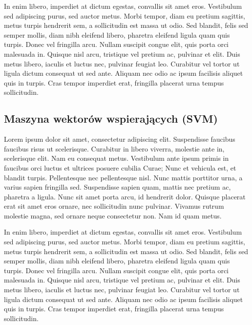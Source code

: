 	In enim libero, imperdiet at dictum egestas, convallis sit amet eros. Vestibulum sed adipiscing purus, sed auctor metus. Morbi tempor, diam eu pretium sagittis, metus turpis hendrerit sem, a sollicitudin est massa ut odio. Sed blandit, felis sed semper mollis, diam nibh eleifend libero, pharetra eleifend ligula quam quis turpis. Donec vel fringilla arcu. Nullam suscipit congue elit, quis porta orci malesuada in. Quisque nisl arcu, tristique vel pretium ac, pulvinar et elit. Duis metus libero, iaculis et luctus nec, pulvinar feugiat leo. Curabitur vel tortor ut ligula dictum consequat ut sed ante. Aliquam nec odio ac ipsum facilisis aliquet quis in turpis. Cras tempor imperdiet erat, fringilla placerat urna tempus sollicitudin.

	\subsection{Maszyna wektorów wspierających (SVM)}
	Lorem ipsum dolor sit amet, consectetur adipiscing elit. Suspendisse faucibus faucibus risus ut scelerisque. Curabitur in libero viverra, molestie ante in, scelerisque elit. Nam eu consequat metus. Vestibulum ante ipsum primis in faucibus orci luctus et ultrices posuere cubilia Curae; Nunc et vehicula est, et blandit turpis. Pellentesque nec pellentesque nisl. Nunc mattis porttitor urna, a varius sapien fringilla sed. Suspendisse sapien quam, mattis nec pretium ac, pharetra a ligula. Nunc sit amet porta arcu, id hendrerit dolor. Quisque placerat erat sit amet eros ornare, nec sollicitudin nunc pulvinar. Vivamus rutrum molestie magna, sed ornare neque consectetur non. Nam id quam metus.

	In enim libero, imperdiet at dictum egestas, convallis sit amet eros. Vestibulum sed adipiscing purus, sed auctor metus. Morbi tempor, diam eu pretium sagittis, metus turpis hendrerit sem, a sollicitudin est massa ut odio. Sed blandit, felis sed semper mollis, diam nibh eleifend libero, pharetra eleifend ligula quam quis turpis. Donec vel fringilla arcu. Nullam suscipit congue elit, quis porta orci malesuada in. Quisque nisl arcu, tristique vel pretium ac, pulvinar et elit. Duis metus libero, iaculis et luctus nec, pulvinar feugiat leo. Curabitur vel tortor ut ligula dictum consequat ut sed ante. Aliquam nec odio ac ipsum facilisis aliquet quis in turpis. Cras tempor imperdiet erat, fringilla placerat urna tempus sollicitudin.
	
